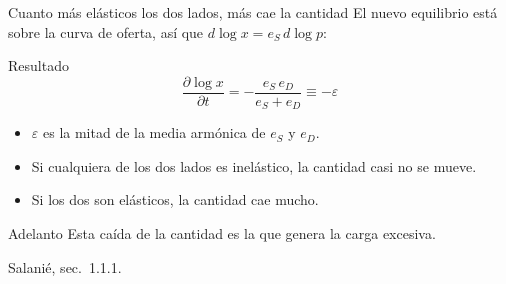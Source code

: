 \documentclass[aspectratio=169,11pt]{beamer}
\newcommand{\fuente}[1]{\par\vfill{\small\color{cGris}#1\par}}
\begin{document}
\begin{frame}{Cuanto más elásticos los dos lados, más cae la cantidad}
  El nuevo equilibrio está sobre la curva de oferta, así que $d\log x = e_S\, d\log p$:
  \begin{block}{Resultado}
    \[ \frac{\partial \log x}{\partial t} = -\frac{e_S\,e_D}{e_S+e_D} \equiv -\varepsilon \]
  \end{block}
  \pause
  \begin{itemize}
    \item $\varepsilon$ es la mitad de la media armónica de $e_S$ y $e_D$.
    \item Si cualquiera de los dos lados es inelástico, la cantidad casi no se mueve.
    \item Si los dos son elásticos, la cantidad cae mucho.
  \end{itemize}
  \pause
  \begin{alertblock}{Adelanto}
    Esta caída de la cantidad es la que genera la carga excesiva.
  \end{alertblock}
  \fuente{Salanié, sec.~1.1.1.}
\end{frame}
\end{document}

